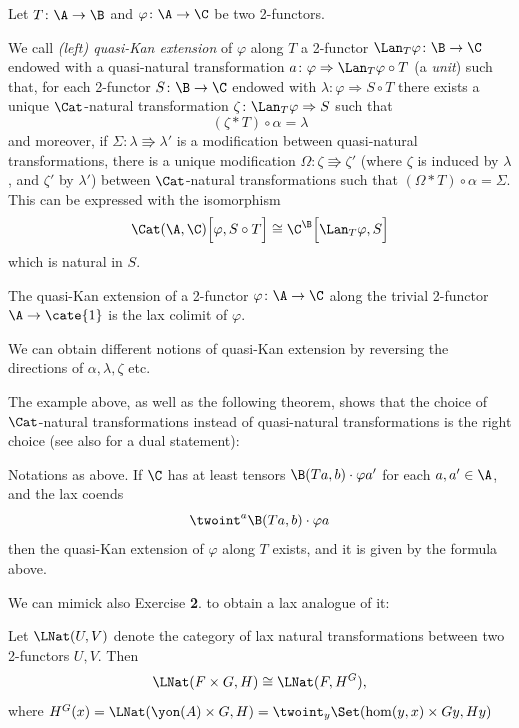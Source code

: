 Let $T\colon \A\to \B$ and $\varphi\colon \A\to \C$ be two 2-functors.
\begin{definition}
We call \emph{(left) quasi-Kan extension} of $\varphi$ along $T$ a 2-functor $\Lan_T\varphi\colon \B\to \C$ endowed with a quasi-natural transformation $a\colon \varphi \Rightarrow \Lan_T\varphi\circ T$ (a \emph{unit}) such that, for each 2-functor $S\colon \B\to \C$ endowed with $\lambda \colon \varphi \Rightarrow S\circ T$ there exists a unique $\Cat$-natural transformation $\zeta\colon \Lan_T\varphi \Rightarrow S$ such that 
\[
(\zeta * T)\circ \alpha = \lambda 
\]
and moreover, if $\Sigma\colon \lambda \Rrightarrow \lambda'$ is a modification between quasi-natural transformations, there is a unique modification $\Omega\colon \zeta\Rrightarrow \zeta'$ (where $\zeta$ is induced by $\lambda$, and $\zeta'$ by $\lambda'$) between $\Cat$-natural transformations such that $(\Omega * T)\circ \alpha = \Sigma$. This can be expressed with the isomorphism
\[
\Cat(\A, \C)\Big[ \varphi, S\circ T \Big]\cong \C^{\B}\Big[ \Lan_T\varphi, S \Big]
\]
which is natural in $S$.
\end{definition}
\begin{example}
The quasi-Kan extension of a 2-functor $\varphi\colon \A\to\C$ along the trivial 2-functor $\A\to \cate{1}$ is the lax colimit of $\varphi$.
\end{example}
\begin{remark}
We can obtain different notions of quasi-Kan extension by reversing the directions of $\alpha, \lambda, \zeta$ etc.

The example above, as well as the following theorem, shows that the choice of $\Cat$-natural transformations instead of quasi-natural transformations is the right choice (see also \cite{bozapalides1980some} for a dual statement):
\end{remark}
\begin{theorem}\label{pseudolan}
Notations as above. If $\C$ has at least tensors $\B(Ta, b)\cdot \varphi a'$ for each $a, a'\in \A$, and the lax coends
\[
\twoint^a \B(Ta, b)\cdot \varphi a
\]
then the quasi-Kan extension of $\varphi$ along $T$ exists, and it is given by the formula above.
\end{theorem}
We can mimick also Exercise \textbf{2}. to obtain a lax analogue of it:
\begin{proposition}
Let $\LNat(U,V)$ denote the category of lax natural transformations between two 2-functors $U,V$. Then
\[
\LNat(F\times G,H)\cong \LNat(F, H^G),
\]
where $H^G(x) = \LNat(\yon(A)\times G, H) = \twoint_y\Set(\hom(y,x)\times Gy, Hy)$
\end{proposition}
